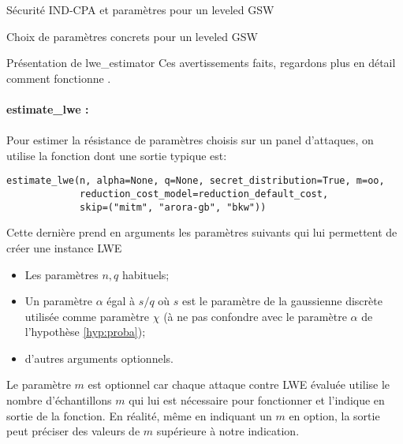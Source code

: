 \begin{section}{Sécurité IND-CPA et paramètres pour un leveled GSW}
\begin{subsection}{Choix de paramètres concrets pour un leveled GSW}
\begin{subsubsection}{Présentation de lwe\_estimator}
Ces avertissements faits, regardons plus en détail comment fonctionne  .


\paragraph{}
\textbf{estimate\_lwe :}

\paragraph{}
Pour estimer la résistance de paramètres choisis sur un panel d'attaques, on utilise la fonction 
dont une sortie typique est:

\flushleft
	
	\begin{lstlisting}
estimate_lwe(n, alpha=None, q=None, secret_distribution=True, m=oo,
             reduction_cost_model=reduction_default_cost,
             skip=("mitm", "arora-gb", "bkw"))
        \end{lstlisting}
	
\flushleft
Cette dernière prend en arguments les paramètres suivants qui lui permettent de créer une instance LWE
\begin{itemize}
\item Les paramètres $n, q$ habituels;
\item Un paramètre $\alpha$ égal à $s / q$ où $s$ est le paramètre de la gaussienne discrète utilisée comme paramètre
$\chi$ (à ne pas confondre avec le paramètre $\alpha$ de l'hypothèse \ref{hyp:proba});
\item d'autres arguments optionnels.
\end{itemize}
Le paramètre $m$ est optionnel car chaque attaque contre LWE évaluée utilise le nombre d'échantillons $m$ qui lui est nécessaire 
pour fonctionner et l'indique en sortie de la fonction. En réalité, même en indiquant un $m$ en option, la
sortie peut préciser des valeurs de $m$ supérieure à notre indication.


\end{subsubsection}
\end{subsection}
\end{section}
